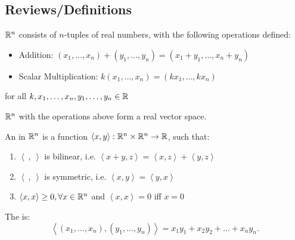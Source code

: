 \documentclass[../main/main.tex]{subfiles}
\begin{document}
\subsection{Reviews/Definitions}
\begin{definition}
   $\mathbb{R}^{n}$ consists of $n$-tuples of real numbers, with the following operations defined: 
   \begin{itemize}
       \item Addition:  $(x_1,\ldots,x_{n})+(y_{1},\ldots,y_{n}) = (x_1+y_1,\ldots,x_{n}+y_{n})$
       \item Scalar Multiplication: $k(x_1,\ldots,x_{n}) = (kx_1,\ldots,kx_{n})$
   \end{itemize}
   for all $k,x_1,\ldots,x_{n},y_1,\ldots,y_{n}\in \mathbb{R}$
\end{definition}

\begin{lemma}
    $ \mathbb{R}^{n}$ with the operations above form a real vector space.
\end{lemma}

\begin{definition}
    An  in $ \mathbb{R}^{n}$ is a function $\left<x,y\right>: \mathbb{R}^{n}\times \mathbb{R}^{n} \to  \mathbb{R}$, such that: 
    \begin{enumerate}
        \item $\left<\ ,\ \right>$ is bilinear, i.e.  $\left<x+y,z\right> = \left<x,z\right>+\left<y,z\right>$
        \item $\left<\ ,\ \right>$ is symmetric, i.e.  $\left<x,y\right> = \left<y,x\right>$
        \item  $\left<x,x\right> \ge 0, \forall x\in \mathbb{R}^{n}$ and $\left<x,x\right> = 0$ iff  $x=0$ 
    \end{enumerate}
\end{definition}

\begin{definition}
    The  is: \[
       \left<(x_1,\ldots,x_{n}),(y_1,\ldots,y_{n})\right> = x_1y_1+x_2y_2+\ldots+x_{n}y_{n}
   .\]  
\end{definition}
\end{document}
